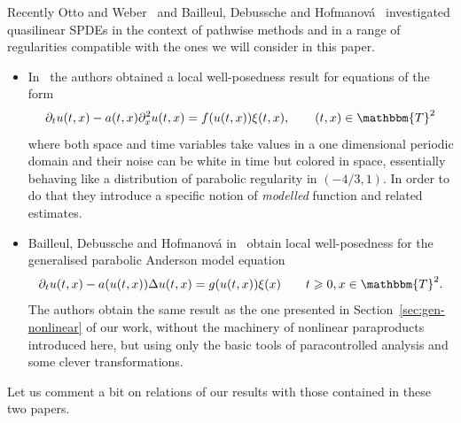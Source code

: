 \documentclass{amsart}
\newcommand{\tmtextit}[1]{{\itshape{#1}}}
\newenvironment{itemizedot}{\begin{itemize} \renewcommand{\labelitemi}{$\bullet$}\renewcommand{\labelitemii}{$\bullet$}\renewcommand{\labelitemiii}{$\bullet$}\renewcommand{\labelitemiv}{$\bullet$}}{\end{itemize}}
\theoremstyle{remark}
\theoremstyle{definition}
\begin{document}
Recently Otto and Weber~{\cite{otto_quasilinear_2016}} and Bailleul,
Debussche and Hofmanov{\'a}~{\cite{hofmanova}} investigated quasilinear SPDEs
in the context of pathwise methods and in a range of regularities compatible
with the ones we will consider in this paper.
\begin{itemizedot}
  \item In~{\cite{otto_quasilinear_2016}} the authors obtained a local
  well-posedness result for equations of the form
  \[ \partial_t u (t, x) - a (t, x) \partial_x^2 u (t, x) = f (u (t, x)) \xi
     (t, x), \qquad (t, x) \in \mathbbm{T}^2 \]
  where both space and time variables take values in a one dimensional
  periodic domain and their noise can be white in time but colored in space,
  essentially behaving like a distribution of parabolic regularity in $(- 4 /
  3, 1)$. In order to do that they introduce a specific notion of
  \tmtextit{modelled} function and related estimates. \ \ \ \
  
  \item Bailleul, Debussche and Hofmanov{\'a} in~{\cite{hofmanova}} obtain
  local well-posedness for the generalised parabolic Anderson model equation
  \begin{equation}
    \partial_t u (t, x) - a (u (t, x)) \Delta u (t, x) = g (u (t, x)) \xi (x)
    \label{eq:deb-hof} \qquad t \geqslant 0, x \in \mathbbm{T}^2 .
  \end{equation}
  The authors obtain the same result as the one presented in
  Section~\ref{sec:gen-nonlinear} of our work, without the machinery of
  nonlinear paraproducts introduced here, but using only the basic tools of
  paracontrolled analysis and some clever transformations. 
\end{itemizedot}
Let us comment a bit on relations of our results with those contained in these
two papers.
\end{document}
